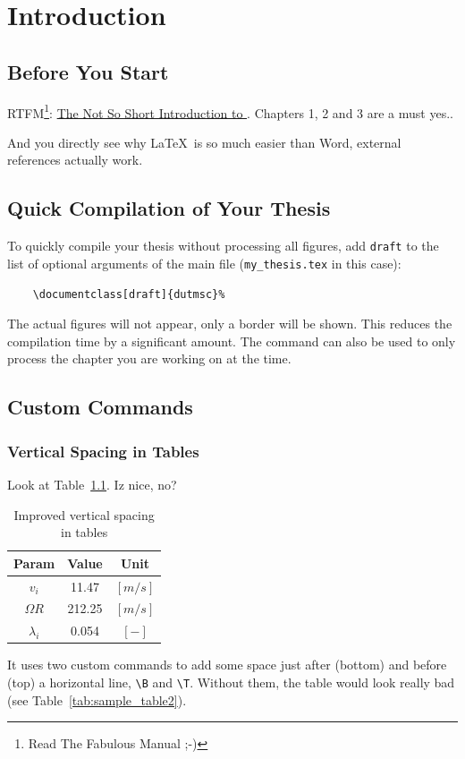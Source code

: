 \chapter{Introduction}
    \section{Before You Start}
        RTFM\footnote{Read The Fabulous Manual ;-)}: \href{http://www.ctan.org/tex-archive/info/lshort/english/lshort.pdf}{The Not So Short Introduction to \LaTeXe}.
        Chapters 1, 2 and 3 are a must yes..
        
        And you directly see why \LaTeX~is so much easier than Word, external references actually work.
    \section{Quick Compilation of Your Thesis}
        To quickly compile your thesis without processing all figures, add \verb+draft+ to the list of optional arguments of the main file (\verb+my_thesis.tex+ in this case):
        \begin{verbatim}
    \documentclass[draft]{dutmsc}%
        \end{verbatim}
        The actual figures will not appear, only a border will be shown. This reduces the compilation time by a significant amount. The command \verb++ can also be used to only process the chapter you are working on at the time.
    \section{Custom Commands}
        \subsection{Vertical Spacing in Tables}
            Look at Table~\ref{tab:sample_table}. Iz nice, no?
            \begin{table}[!htb]
                \centering
                \begin{tabular}{ c c c }
                    \hline
                    Param\T\B                   & Value   & Unit    \\
                    \hline
                    $v_i$\T                     & 11.47   & $[m/s]$ \\
                    $\Omega R$                  & 212.25  & $[m/s]$ \\
                    $\lambda_i$\B               & 0.054   & $[-]$   \\
                    \hline
                \end{tabular}
                \caption{Improved vertical spacing in tables}\label{tab:sample_table}
            \end{table}
            It uses two custom commands to add some space just after (bottom) and before (top) a horizontal line, \verb+\B+ and \verb+\T+. Without them, the table would look really bad (see Table~\ref{tab:sample_table2}).
            
